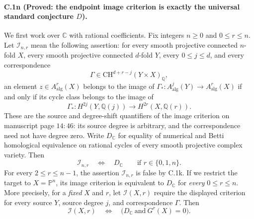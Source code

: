 \paragraph{C.1n (Proved: the endpoint image criterion is exactly the
universal standard conjecture $D$).}
We first work over $\mathbb C$ with rational coefficients. Fix integers
$n\ge0$ and $0\le r\le n$. Let $\mathcal I_{n,r}$ mean the
following assertion: for every smooth projective connected
$n$-fold $X$, every smooth projective connected $d$-fold $Y$,
every $0\le j\le d$, and every correspondence
\[
 \Gamma\in\mathrm{CH}^{d+r-j}(Y\times X)_{\mathbb Q},
\]
an element $z\in A^r_{\mathrm{alg}}(X)$ belongs to the image
of $\Gamma_*:A^j_{\mathrm{alg}}(Y)\to A^r_{\mathrm{alg}}(X)$
if and only if its cycle class belongs to the image of
\[
 \Gamma_*:H^{2j}(Y,\mathbb Q(j))
                      \longrightarrow H^{2r}(X,\mathbb Q(r)).
\]
These are the source and degree-shift quantifiers of the image
criterion on manuscript page $14{:}46$: its source degree is
arbitrary, and the correspondence need not have degree zero.
Write $D_{\mathbb C}$ for equality of numerical and Betti
homological equivalence on rational cycles of every smooth
projective complex variety. Then
\begin{equation}\label{eq:endpoint-image-D}
 \mathcal I_{n,r}\quad\Longleftrightarrow\quad D_{\mathbb C}
       \qquad\text{if }r\in\{0,1,n\}.
\end{equation}
For every $2\le r\le n-1$, the assertion $\mathcal I_{n,r}$
is false by C.1k. If we restrict the target to
$X=\mathbb P^n$, its image criterion is equivalent to
$D_{\mathbb C}$ for \emph{every} $0\le r\le n$.
More precisely, for a \emph{fixed} $X$ and $r$, let
$\mathcal I(X,r)$ require the displayed criterion for every
source $Y$, source degree $j$, and correspondence $\Gamma$.
Then
\begin{equation}\label{eq:fixed-target-image-D}
 \mathcal I(X,r)\quad\Longleftrightarrow\quad
             \bigl(D_{\mathbb C}\ \text{and}\ G^r(X)=0\bigr).
\end{equation}

